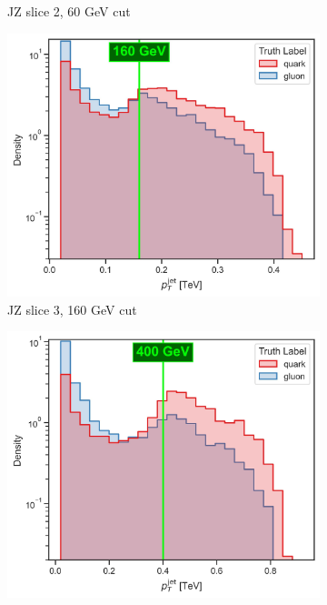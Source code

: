 \begin{figure}[!htb]
\begin{subfigure}[t]{0.49\textwidth}
        \caption{JZ slice 2, 60 GeV cut}
        \label{fig:jz_separete_2}
    \end{subfigure}
    \begin{subfigure}[t]{0.49\textwidth}
        \centering
        \includegraphics[width=\linewidth]{src/plots/pt_jet_label_3.jpg}
        \caption{JZ slice 3, 160 GeV cut}
        \label{fig:jz_separete_3}
    \end{subfigure}
    \begin{subfigure}[t]{0.49\textwidth}
        \centering
        \includegraphics[width=\linewidth]{src/plots/pt_jet_label_4.jpg}

\end{subfigure}
\end{figure}

